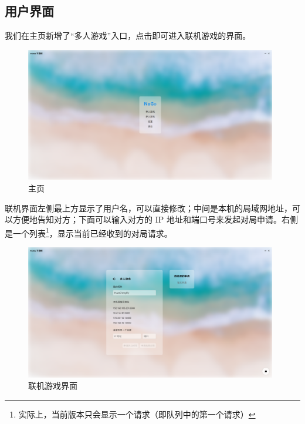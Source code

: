 \documentclass[UTF8]{ctexart}
\begin{document}
\subsection{用户界面}
我们在主页新增了“多人游戏”入口，点击即可进入联机游戏的界面。\par
\begin{figure}[H]
	\centering
	\includegraphics[width=11cm]{Images/Home.png}
	\caption{主页}
\end{figure}
联机界面左侧最上方显示了用户名，可以直接修改；中间是本机的局域网地址，可以方便地告知对方；下面可以输入对方的 IP 地址和端口号来发起对局申请。右侧是一个列表\footnote{实际上，当前版本只会显示一个请求（即队列中的第一个请求）}，显示当前已经收到的对局请求。\par
\begin{figure}[H]
	\centering
	\includegraphics[width=11cm]{Images/OnlinePlay.png}
	\caption{联机游戏界面}
\end{figure}
\end{document}
